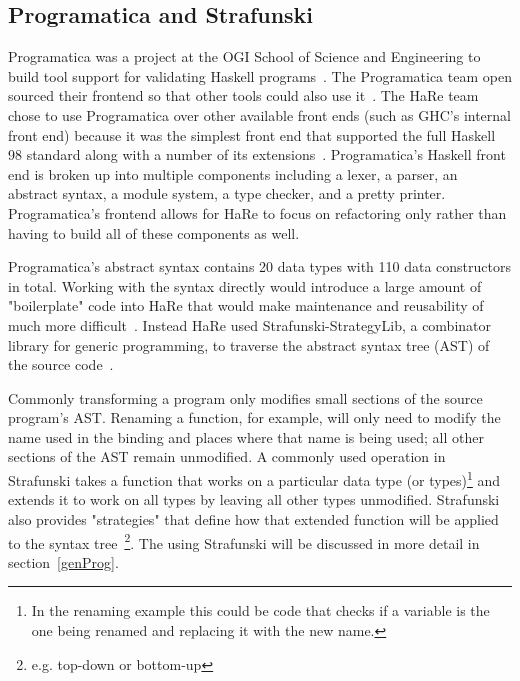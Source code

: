 \subsection{Programatica and Strafunski}\label{prog&Strafunski}

Programatica was a project at the OGI School of Science and Engineering to build tool support for validating Haskell programs~\citep{programaticaTools}. The Programatica team open sourced their frontend so that other tools could also use it~\citep{refacWebsite}. The HaRe team chose to use Programatica over other available front ends (such as GHC's internal front end) because it was the simplest front end that supported the full Haskell 98 standard along with a number of its extensions~\citep{huiqingThesis}. Programatica's Haskell front end is broken up into multiple components including a lexer, a parser, an abstract syntax, a module system, a type checker, and a pretty printer. Programatica's frontend allows for HaRe to focus on refactoring only rather than having to build all of these components as well.

Programatica's abstract syntax contains 20 data types with 110 data constructors in total. Working with the syntax directly would introduce a large amount of "boilerplate" code into HaRe that would make maintenance and reusability of much more difficult~\citep{huiqingThesis}. Instead HaRe used Strafunski-StrategyLib, a combinator library for generic programming, to traverse the abstract syntax tree (AST) of the source code~\citep{strafunski}. 

Commonly transforming a program only modifies small sections of the source program's AST. Renaming a function, for example, will only need to modify the name used in the binding and places where that name is being used; all other sections of the AST remain unmodified. A commonly used operation in Strafunski takes a function that works on a particular data type (or types)\footnote{In the renaming example this could be code that checks if a variable is the one being renamed and replacing it with the new name.} and extends it to work on all types by leaving all other types unmodified. Strafunski also provides "strategies" that define how that extended function will be applied to the syntax tree~\citep{strafunski}\footnote{e.g. top-down or bottom-up}. The using Strafunski will be discussed in more detail in section~\ref{genProg}.

